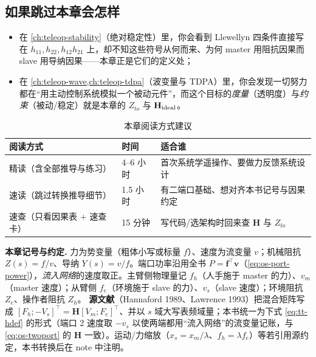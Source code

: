 \subsection*{如果跳过本章会怎样}
\begin{itemize}
  \item 在 \cref{ch:teleop-stability}（绝对稳定性）里，你会看到 Llewellyn 四条件直接写在 $h_{11},h_{22},h_{12}h_{21}$ 上，却不知这些符号从何而来、为何 master 用阻抗因果而 slave 用导纳因果——本章正是它们的定义处；
  \item 在 \cref{ch:teleop-wave,ch:teleop-tdpa}（波变量与 TDPA）里，你会发现一切努力都在“用主动控制系统模拟一个被动元件”，而这个目标的\emph{度量}（透明度）与\emph{约束}（被动/稳定）就是本章的 $Z_{to}$ 与 $\mathbf H_{\rm ideal}$。
\end{itemize}

\begin{table}[H]\centering\small
\caption{本章阅读方式建议}
\begin{tabular}{lll}
\toprule
阅读方式 & 时间 & 适合谁 \\
\midrule
精读（含全部推导与练习） & 4--6 小时 & 首次系统学遥操作、要做力反馈系统设计 \\
速读（跳过转换推导细节） & 1.5 小时 & 有二端口基础、想对齐本书记号与因果约定 \\
速查（只看因果表 + 速查卡） & 15 分钟 & 写代码/选架构时回来查 $\mathbf H$ 与 $Z_{to}$ \\
\bottomrule
\end{tabular}
\end{table}

\begin{note}
\textbf{本章记号与约定.}\;
力为势变量（粗体小写或标量 $f$）、速度为流变量 $v$；机械阻抗 $Z(s)=f/v$、导纳 $Y(s)=v/f$。端口功率沿用全书 $P=\mathbf f^\top\mathbf v$（\cref{eq:os-port-power}），\emph{流入网络}的速度取正。主臂侧物理量记 $f_h$（人手施于 master 的力）、$v_m$（master 速度）；从臂侧 $f_e$（环境施于 slave 的力）、$v_s$（slave 速度）；环境阻抗 $Z_e$、操作者阻抗 $Z_h$。
\textbf{源文献}（Hannaford 1989、Lawrence 1993）把混合矩阵写成 $[F_h;-V_s]^\top=\mathbf H[V_m;F_e]^\top$、并以 $s$ 域大写表频域量；本书统一为下式 \cref{eq:tt-hdef} 的形式（端口 2 速度取 $-v_s$ 以使两端都用“流入网络”的流变量记账，与 \cref{eq:os-twoport} 的 $\mathbf H$ 一致）。运动/力缩放（$x_s=x_m/\lambda$、$f_h=\lambda f_e$）等若引用源约定，本书转换后在 note 中注明。
\end{note}

